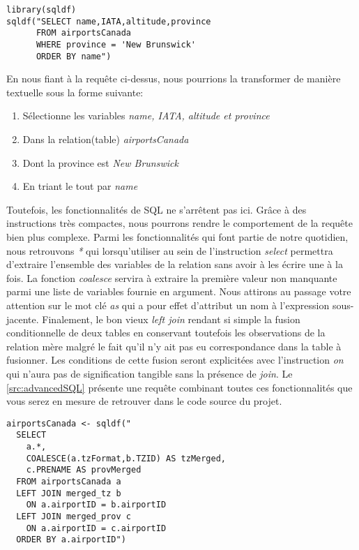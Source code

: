 \begin{lstlisting}[caption = Exemple de requête SQL,label=src:simpleSQL]
library(sqldf)
sqldf("SELECT name,IATA,altitude,province
      FROM airportsCanada
      WHERE province = 'New Brunswick'
      ORDER BY name")
\end{lstlisting}

\vspace{\baselineskip}
\noindent
En nous fiant à la requête ci-dessus, nous pourrions la transformer de manière textuelle sous la forme suivante:
\begin{enumerate}
	\item Sélectionne les variables \emph{name, IATA, altitude et province}
	\item Dans la relation(table) \emph{airportsCanada}
	\item Dont la province est \emph{New Brunswick}
	\item En triant le tout par \emph{name}
\end{enumerate}

\noindent
Toutefois, les fonctionnalités de SQL ne s'arrêtent pas ici. Grâce à des instructions très compactes, nous pourrons rendre le comportement de la requête bien plus complexe. Parmi les fonctionnalités qui font partie de notre quotidien, nous retrouvons \emph{*} qui lorsqu'utiliser au sein de l'instruction \emph{select} permettra d'extraire l'ensemble des variables de la relation sans avoir à les écrire une à la fois. La fonction \emph{coalesce} servira à extraire la première valeur non manquante parmi une liste de variables fournie en argument. Nous attirons au passage votre attention sur le mot clé \emph{as} qui a pour effet d'attribut un nom à l'expression sous-jacente. Finalement, le bon vieux \emph{left join} rendant si simple la fusion conditionnelle de deux tables en conservant toutefois les observations de la relation mère malgré le fait qu'il n'y ait pas eu correspondance dans la table à fusionner. Les conditions de cette fusion seront explicitées avec l'instruction \emph{on} qui n'aura pas de signification tangible sans la présence de \emph{join}. Le \autoref{src:advancedSQL} présente une requête combinant toutes ces fonctionnalités que vous serez en mesure de retrouver dans le code source du projet.

\begin{lstlisting}[caption = Fonctionnalités avancées de SQL,label=src:advancedSQL]
airportsCanada <- sqldf("
  SELECT 
    a.*, 
    COALESCE(a.tzFormat,b.TZID) AS tzMerged,
    c.PRENAME AS provMerged
  FROM airportsCanada a 
  LEFT JOIN merged_tz b
  	ON a.airportID = b.airportID
  LEFT JOIN merged_prov c
  	ON a.airportID = c.airportID
  ORDER BY a.airportID")
\end{lstlisting}

